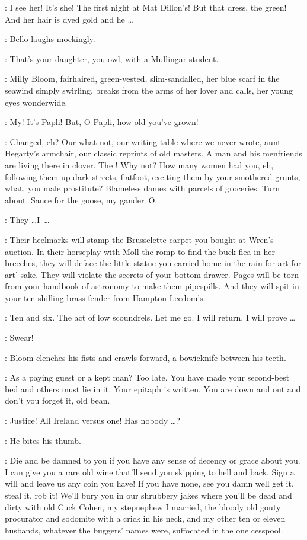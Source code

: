 \Bloom:
I see her!
It's she!
The first night at Mat Dillon's!
But that dress, the green!
And her hair is dyed gold and he \ldots

:
Bello laughs mockingly.

\Bello:
That's your daughter, you owl, with a Mullingar student.

:
Milly Bloom, fairhaired, green-vested, slim-sandalled,
her blue scarf in the seawind simply swirling,
breaks from the arms of her lover and calls,
her young eyes wonder\-wide.

\Milly:
My!
It's Papli!
But, O Papli, how old you've grown!

\Bello:
Changed, eh?
Our what-not, our writing table where we never wrote,
aunt Hegarty's armchair, our classic reprints of old masters.
A man and his menfriends are living there in clover.
The !
Why not?
How many women had you, eh, following them up dark streets, flatfoot,
exciting them by your smothered grunts, what, you male prostitute?
Blameless dames with parcels of groceries.
Turn about.
Sauce for the goose, my gander~O.

\Bloom:
They \ldots I~\ldots

\Bello:
Their heelmarks will stamp the Brusselette carpet you bought at Wren's auction.
In their horseplay with Moll the romp to find the buck flea in her breeches,
they will deface the little statue
you carried home in the rain for art for art' sake.
They will violate the secrets of your bottom drawer.
Pages will be torn from your handbook of astronomy to make them pipespills.
And they will spit in your ten shilling brass fender from Hampton Leedom's.

\Bloom:
Ten and six.
The act of low scoundrels.
Let me go.
I will return.
I will prove \ldots

\Voice:
Swear!

:
Bloom clenches his fists and crawls forward,
a bowieknife between his teeth.

\Bello:
As a paying guest or a kept man?
Too late.
You have made your second-best bed and others must lie in it.
Your epitaph is written.
You are down and out and don't you forget it, old bean.%

\Bloom:
Justice!
All Ireland versus one!
Has nobody \ldots?

:
He bites his thumb.

\Bello:
Die and be damned to you if you have any sense of decency or grace about you.
I can give you a rare old wine that'll send you skipping to hell and back.
Sign a will and leave us any coin you have!
If you have none, see you damn well get it, steal it, rob it!
We'll bury you in our shrubbery jakes where you'll be dead and dirty with old Cuck Cohen,
my stepnephew I married, the bloody old gouty procurator and sodomite
with a crick in his neck, and my other ten or eleven husbands,
whatever the buggers' names were, suffocated in the one cesspool.

